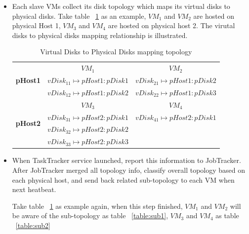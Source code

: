 \documentclass[11pt,a4paper]{article}
\begin{document}
\begin{itemize}

\item Each slave VMs collect its disk topology which maps its virtual 
  disks to physical disks. Take table ~\ref{table:origindata} as an example, 
  $VM_1$ and $VM_2$ are hosted on physical Host 1, $VM_3$ and $VM_4$ are hosted on physical 
  host 2. The virutal disks to physical disks mapping relationship is illustrated.

\begin{table}
\centering
\caption{Virtual Disks to Physical Disks mapping topology}
\begin{tabular}{|c|c|c|}
\hline
\multirow{3}{*}{\textbf{pHost1}} &  \textbf{$VM_1$} & \textbf{$VM_2$} \\
\cline{2-3}
                        & $vDisk_{11} \mapsto pHost1:pDisk1$ & $vDisk_{21} \mapsto pHost1:pDisk2$ \\
                        & $vDisk_{12} \mapsto pHost1:pDisk2$ & $vDisk_{22} \mapsto pHost1:pDisk3$ \\
\hline
\multirow{4}{*}{\textbf{pHost2}} & \textbf{$VM_3$} & \textbf{$VM_4$} \\
\cline{2-3}
                        & $vDisk_{31} \mapsto pHost2:pDisk1$ & $vDisk_{41} \mapsto pHost2:pDisk1$ \\
                        & $vDisk_{32} \mapsto pHost2:pDisk2$ & \\
                        & $vDisk_{33} \mapsto pHost2:pDisk3$ & \\
\hline
\end{tabular}
\label{table:origindata}
\end{table}


\item When TaskTracker service launched, 
report this information to JobTracker. After JobTracker merged all topology 
info, classify overall topology based on each physical host, and send back 
related sub-topology to each VM when next heatbeat. 

Take table ~\ref{table:origindata} as example again, when this step finished, $VM_1$ and $VM_2$ 
will be aware of the sub-topology as table ~\ref{table:sub1}, $VM_3$ and $VM_4$ as table ~\ref{table:sub2}


\end{itemize}
\end{document}
